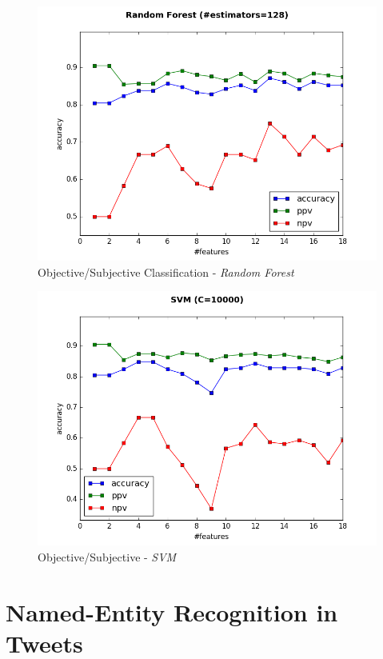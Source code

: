 \documentclass[letterpaper,twocolumn,10pt]{article}
\begin{document}
\begin{figure}[H]
	\centering
	\includegraphics[width=\columnwidth]{../graphs/SentimentAnalysis/random_forest.png}
	\caption{Objective/Subjective Classification - \textit{Random Forest}}
	\label{fig:obj_sub_classification_rf}
\end{figure}

\begin{figure}[H]
	\centering
	\includegraphics[width=\columnwidth]{../graphs/SentimentAnalysis/SVM.png}
	\caption{Objective/Subjective - \textit{SVM}}
	\label{fig:obj_sub_classification_svm}
\end{figure}

\section{Named-Entity Recognition in Tweets}  \label{mission3}
\end{document}

